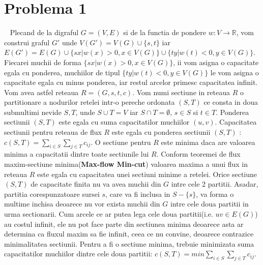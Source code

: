 \documentclass{article}
\begin{document}
\section{Problema 1}
\  
\newline
Plecand de la digraful $G=(V,E)$ si de la functia de pondere $w:V\rightarrow\mathbb{R}$, vom construi graful $G'$ unde $V(G')=V(G)\cup\{s,t\}$ iar $E(G')=E(G)\cup\{sx|w(x)>0, x\in V(G)\}\cup\{ty|w(t)<0, y\in V(G)\}$. Fiecarei muchii de forma $\{sx|w(x)>0, x\in V(G)\}$, ii vom asigna o capacitate egala cu ponderea, muchiilor de tipul $\{ty|w(t)<0, y\in V(G)\}$ le vom asigna o capacitate egala cu minus ponderea, iar restul arcelor primesc capacitatea infinit. 
\newline
\newline
Vom avea astfel reteaua $R=(G,s,t,c)$. Vom numi sectiune in reteaua $R$ o partitionare a nodurilor retelei intr-o pereche ordonata $(S,T)$ ce consta in doua submultimi nevide $S,T$, unde $S\cup T=V$ iar $S\cap T=\emptyset$, $s \in S$ si $t \in T$.
Ponderea sectiunii $(S,T)$ este egala cu suma capacitatilor muchiilor $(u,v)$.
Capacitatea sectiunii pentru reteaua de flux $R$ este egala cu ponderea sectiunii $(S,T)$ : $c(S,T)=\sum_{i \in S}\sum_{j \in T} c_{ij}$. 
\newline
\newline
O sectiune pentru $R$ este minima daca are valoarea minima a capacitatii dintre toate sectiunile lui $R$. Conform teoremei de flux maxim-sectiune minima(\textbf{Max-flow Min-cut}) valoarea maxima a unui flux in reteaua $R$ este egala cu capacitatea unei sectiuni minime a retelei.
\newline
\newline
Orice sectiune $(S,T)$ de capacitate finita nu va avea muchii din $G$ intre cele 2 partitii. Asadar, partitia corespunzatoare sursei $s$, care va fi  inclusa in $S-\{s\}$, va forma o multime inchisa deoarece nu vor exista muchii din $G$ intre cele doua partitii in urma sectionarii. Cum arcele ce ar putea lega cele doua partitii(i.e. $uv \in E(G)$) au costul infinit, ele nu pot face parte din sectiunea minima deoarece asta ar determina ca fluxul maxim sa fie infinit, ceea ce nu convine, deoarece contrazice minimalitatea sectiunii.
\newline
\newline
Pentru a fi o sectiune minima, trebuie minimizata suma capacitatilor muchiilor dintre cele doua partitii:  $c(S,T)=min\sum_{i \in S}\sum_{j \in T} c_{ij}$. 
\newline
\newline
\end{document}

